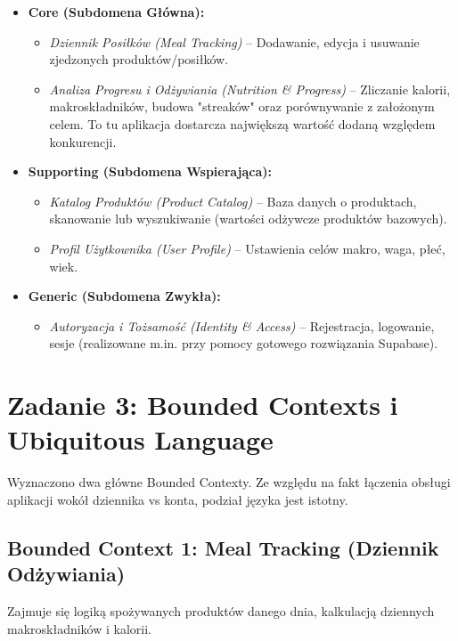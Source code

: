 \documentclass[12pt,a4paper]{article}
\begin{document}
\begin{itemize}
    \item \textbf{Core (Subdomena Główna):} 
    \begin{itemize}
        \item \textit{Dziennik Posiłków (Meal Tracking)} -- Dodawanie, edycja i usuwanie zjedzonych produktów/posiłków.
        \item \textit{Analiza Progresu i Odżywiania (Nutrition \& Progress)} -- Zliczanie kalorii, makroskładników, budowa "streaków" oraz porównywanie z założonym celem. To tu aplikacja dostarcza największą wartość dodaną względem konkurencji.
    \end{itemize}
    
    \item \textbf{Supporting (Subdomena Wspierająca):}
    \begin{itemize}
        \item \textit{Katalog Produktów (Product Catalog)} -- Baza danych o produktach, skanowanie lub wyszukiwanie (wartości odżywcze produktów bazowych).
        \item \textit{Profil Użytkownika (User Profile)} -- Ustawienia celów makro, waga, płeć, wiek.
    \end{itemize}
    
    \item \textbf{Generic (Subdomena Zwykła):}
    \begin{itemize}
        \item \textit{Autoryzacja i Tożsamość (Identity \& Access)} -- Rejestracja, logowanie, sesje (realizowane m.in. przy pomocy gotowego rozwiązania Supabase).
    \end{itemize}
\end{itemize}

\section{Zadanie 3: Bounded Contexts i Ubiquitous Language}

Wyznaczono dwa główne Bounded Contexty. Ze względu na fakt łączenia obsługi aplikacji wokół dziennika vs konta, podział języka jest istotny.

\subsection{Bounded Context 1: Meal Tracking (Dziennik Odżywiania)}
Zajmuje się logiką spożywanych produktów danego dnia, kalkulacją dziennych makroskładników i kalorii.
\end{document}
